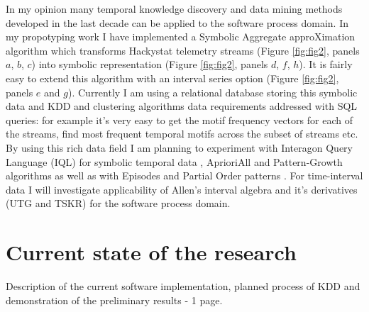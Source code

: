 \documentclass[11pt,oneside]{article}
\begin{document}
In my opinion many temporal knowledge discovery and data mining methods developed in the last decade can be applied to the software process domain. In my propotyping work I have implemented a Symbolic Aggregate approXimation algorithm \cite{citeulike:2821475} which transforms Hackystat telemetry streams (Figure \ref{fig:fig2}, panels $a$, $b$, $c$) into symbolic representation (Figure \ref{fig:fig2}, panels $d$, $f$, $h$). It is fairly easy to extend this algorithm with an interval series option (Figure \ref{fig:fig2}, panels $e$ and $g$). Currently I am using a relational database storing this symbolic data and KDD and clustering algorithms data requirements addressed with SQL queries: for example it's very easy to get the motif frequency vectors for each of the streams, find most frequent temporal motifs across the subset of streams etc. By using this rich data field I am planning to experiment with Interagon Query Language (IQL) for symbolic temporal data \cite{citeulike:5043086}, AprioriAll \cite{citeulike:775528} and Pattern-Growth algorithms \cite{citeulike:5043097} as well as with Episodes \cite{citeulike:5043099} and Partial Order patterns \cite{citeulike:5043101}. For time-interval data I will investigate applicability of Allen's interval algebra \cite{citeulike:191348} and it's derivatives (UTG \cite{citeulike:5043086} and TSKR\cite{citeulike:3978076}) for the software process domain. 

\section{Current state of the research}
Description of the current software implementation, planned process of KDD and demonstration of the preliminary results - 1 page.



\end{document}
